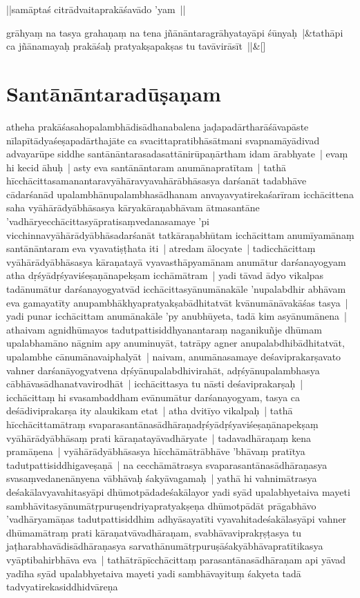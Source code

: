 \documentclass[article,12pt,a4paper]{memoir}
\begin{document}
	  \pstart ||samāptaś citrādvaitaprakāśavādo 'yam ||
	\pend
      
	    
	    \stanza[\smallbreak]
	grāhyaṃ na tasya grahaṇaṃ na tena jñānāntaragrāhyatayāpi śūnyaḥ |&tathāpi ca jñānamayaḥ prakāśaḥ pratyakṣapakṣas tu tavāvirāsīt ||\&[\smallbreak]


	
	  
	
\section[{Santānāntaradūṣaṇam}]{Santānāntaradūṣaṇam}\label{Santānāntaradūṣaṇam}

	  \pstart atheha prakāśasahopalambhādisādhanabalena jaḍapadārtharāśāvapāste nīlapītādyaśeṣapadārthajāte ca svacittapratibhāsātmani svapnamāyādivad advayarūpe siddhe santānāntarasadasattānirūpaṇārtham idam ārabhyate | \label{thakur75-145.6} evaṃ hi kecid āhuḥ | asty eva santānāntaram anumānapratītam | tathā hīcchācittasamanantaravyāhāravyavahārābhāsasya darśanāt tadabhāve cādarśanād upalambhānupalambhasādhanam anvayavyatirekaśarīram icchācittena saha vyāhārādyābhāsasya kāryakāraṇabhāvam ātmasantāne 'vadhāryecchācittasyāpratisaṃvedanasamaye 'pi vicchinnavyāhārādyābhāsadarśanāt tatkāraṇabhūtam icchācittam anumīyamānaṃ santānāntaram eva vyavatiṣṭhata iti | \label{thakur75-145.12} atredam ālocyate | tadicchācittaṃ vyāhārādyābhāsasya kāraṇatayā vyavasthāpyamānam anumātur darśanayogyam atha dṛśyādṛśyaviśeṣaṇānapekṣam icchāmātram | yadi tāvad ādyo vikalpas tadānumātur darśanayogyatvād icchācittasyānumānakāle 'nupalabdhir abhāvam eva gamayatīty anupambhākhyapratyakṣabādhitatvāt kvānumānāvakāśas tasya | yadi punar icchācittam anumānakāle 'py anubhūyeta, tadā kim asyānumānena | athaivam agnidhūmayos tadutpattisiddhyanantaraṃ naganikuñje dhūmam upalabhamāno nāgnim apy anuminuyāt, tatrāpy agner anupalabdhibādhitatvāt, upalambhe cānumānavaiphalyāt | naivam, anumānasamaye deśaviprakarṣavato vahner darśanāyogyatvena dṛśyānupalabdhivirahāt, adṛśyānupalambhasya cābhāvasādhanatvavirodhāt | icchācittasya tu nāsti deśaviprakarṣaḥ | icchācittaṃ hi svasambaddham evānumātur darśanayogyam, tasya ca deśādiviprakarṣa ity alaukikam etat | \label{thakur75-145.23} atha dvitīyo vikalpaḥ | tathā hīcchācittamātraṃ svaparasantānasādhāraṇadṛśyādṛśyaviśeṣaṇānapekṣaṃ vyāhārādyābhāsaṃ prati kāraṇatayāvadhāryate | tadavadhāraṇaṃ kena pramāṇena | vyāhārādyābhāsasya hīcchāmātrābhāve 'bhāvaṃ pratītya tadutpattisiddhigaveṣaṇā | na cecchāmātrasya svaparasantānasādhāraṇasya svasaṃvedanenānyena vābhāvaḥ śakyāvagamaḥ | yathā hi vahnimātrasya deśakālavyavahitasyāpi dhūmotpādadeśakālayor yadi syād upalabhyetaiva mayeti sambhāvitasyānumātṛpuruṣendriyapratyakṣeṇa dhūmotpādāt prāgabhāvo 'vadhāryamāṇas tadutpattisiddhim adhyāsayatīti vyavahitadeśakālasyāpi vahner dhūmamātraṃ prati kāraṇatvāvadhāraṇam, svabhāvaviprakṛṣṭasya tu jaṭharabhavādisādhāraṇasya sarvathānumātṛpuruṣāśakyābhāvapratītikasya vyāptibahirbhāva eva | tathātrāpīcchācittaṃ parasantānasādhāraṇam api yāvad yadīha syād upalabhyetaiva mayeti yadi sambhāvayituṃ śakyeta tadā tadvyatirekasiddhidvāreṇa 
\end{document}
